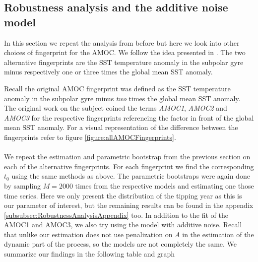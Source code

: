 \subsection{Robustness analysis and the additive noise model}
In this section we repeat the analysis from before but here we look into other choices of fingerprint for the AMOC. We follow the idea presented in \cite{Ditlevsen2023}. The two alternative fingerprints are the SST temperature anomaly in the subpolar gyre minus respectively one or three times the global mean SST anomaly.

Recall the original AMOC fingerprint was defined as the SST temperature anomaly in the subpolar gyre minus \textit{two} times the global mean SST anomaly. The original work on the subject coined the terms \textit{AMOC1}, \textit{AMOC2} and \textit{AMOC3} for the respective fingerprints referencing the factor in front of the global mean SST anomaly. For a visual representation of the difference between the fingerprints refer to figure \ref{figure:allAMOCFingerprints}.\\\\
We repeat the estimation and parametric bootstrap from the previous section on each of the alternative fingerprints. For each fingerprint we find the corresponding $t_0$ using the same methods as above. The parametric bootstraps were again done by sampling $M = 2000$ times from the respective models and estimating one those time series. Here we only present the distribution of the tipping year as this is our parameter of interest, but the remaining results can be found in the appendix \ref{subsubsec:RobustnessAnalysisAppendix} too. In addition to the fit of the AMOC1 and AMOC3, we also try using the model with additive noise. Recall that unlike \cite{Ditlevsen2023} our estimation does not use penalization on $A$ in the estimation of the dynamic part of the process, so the models are not completely the same. We summarize our findings in the following table and graph
